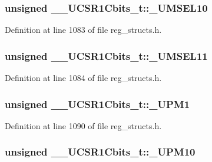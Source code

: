 \hypertarget{union_____u_c_s_r1_cbits__t_a25a222d46ecc7bfdf05c7d261eccae07}{
\subsubsection[{\+\_\+\+U\+M\+S\+E\+L10}]{\setlength{\rightskip}{0pt plus 5cm}unsigned \+\_\+\+\_\+\+U\+C\+S\+R1\+Cbits\+\_\+t\+::\+\_\+\+U\+M\+S\+E\+L10}}\label{union_____u_c_s_r1_cbits__t_a25a222d46ecc7bfdf05c7d261eccae07}


Definition at line 1083 of file reg\+\_\+structs.\+h.

\hypertarget{union_____u_c_s_r1_cbits__t_af72a2583fe7a1b2f0de729ed1d5147ec}{
\subsubsection[{\+\_\+\+U\+M\+S\+E\+L11}]{\setlength{\rightskip}{0pt plus 5cm}unsigned \+\_\+\+\_\+\+U\+C\+S\+R1\+Cbits\+\_\+t\+::\+\_\+\+U\+M\+S\+E\+L11}}\label{union_____u_c_s_r1_cbits__t_af72a2583fe7a1b2f0de729ed1d5147ec}


Definition at line 1084 of file reg\+\_\+structs.\+h.

\hypertarget{union_____u_c_s_r1_cbits__t_a8cd017a636f44888a0c77191f12c88f8}{
\subsubsection[{\+\_\+\+U\+P\+M1}]{\setlength{\rightskip}{0pt plus 5cm}unsigned \+\_\+\+\_\+\+U\+C\+S\+R1\+Cbits\+\_\+t\+::\+\_\+\+U\+P\+M1}}\label{union_____u_c_s_r1_cbits__t_a8cd017a636f44888a0c77191f12c88f8}


Definition at line 1090 of file reg\+\_\+structs.\+h.

\hypertarget{union_____u_c_s_r1_cbits__t_a10bba9312940dc261cd64e42a7f3d4ee}{
\subsubsection[{\+\_\+\+U\+P\+M10}]{\setlength{\rightskip}{0pt plus 5cm}unsigned \+\_\+\+\_\+\+U\+C\+S\+R1\+Cbits\+\_\+t\+::\+\_\+\+U\+P\+M10}}\label{union_____u_c_s_r1_cbits__t_a10bba9312940dc261cd64e42a7f3d4ee}


